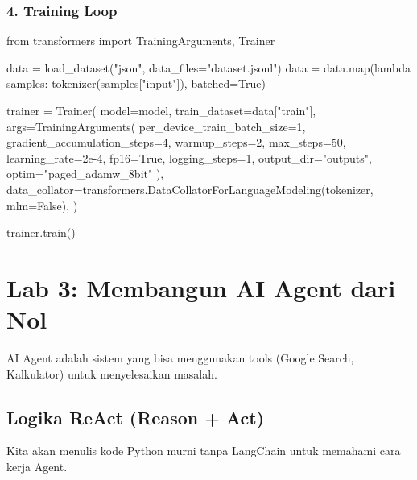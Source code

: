 \subsection{4. Training Loop}
\begin{codeblock}[language=Python]
from transformers import TrainingArguments, Trainer

data = load_dataset("json", data_files="dataset.jsonl")
data = data.map(lambda samples: tokenizer(samples["input"]), batched=True)

trainer = Trainer(
    model=model,
    train_dataset=data["train"],
    args=TrainingArguments(
        per_device_train_batch_size=1,
        gradient_accumulation_steps=4,
        warmup_steps=2,
        max_steps=50,
        learning_rate=2e-4,
        fp16=True,
        logging_steps=1,
        output_dir="outputs",
        optim="paged_adamw_8bit"
    ),
    data_collator=transformers.DataCollatorForLanguageModeling(tokenizer, mlm=False),
)

trainer.train()
\end{codeblock}

\chapter{Lab 3: Membangun AI Agent dari Nol}
\label{chap:lab3}

AI Agent adalah sistem yang bisa menggunakan tools (Google Search, Kalkulator) untuk menyelesaikan masalah.

\section{Logika ReAct (Reason + Act)}

Kita akan menulis kode Python murni tanpa LangChain untuk memahami cara kerja Agent.

